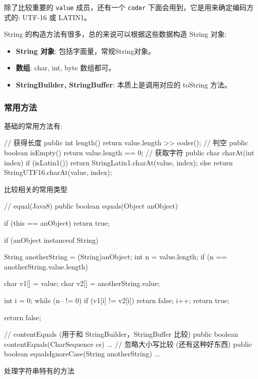 除了比较重要的 \texttt{value} 成员，还有一个 \texttt{coder} 下面会用到，它是用来确定编码方式的: UTF-16 或 LATIN1。

String 的构造方法有很多，总的来说可以根据这些数据构造 String 对象:
\begin{itemize}
    \item \textbf{String 对象}: 包括字面量，常规String对象。
    \item \textbf{数组}: char, int, byte 数组都可。
    \item \textbf{StringBuilder, StringBuffer}: 本质上是调用对应的 toString 方法。
\end{itemize}

\subsubsection{常用方法}

基础的常用方法有:
\begin{Java}
// 获得长度
public int length() {
    return value.length >> coder();
}
// 判空
public boolean isEmpty() {
    return value.length == 0;
}
// 获取字符
public char charAt(int index) {
    if (isLatin1())
        return StringLatin1.charAt(value, index);
    else
        return StringUTF16.charAt(value, index);
}
\end{Java}

比较相关的常用类型
\begin{Java}
// equal(Java8)
public boolean equals(Object anObject) {
    if (this == anObject)
        return true;
    
    if (anObject instanceof String) {
        String anotherString = (String)anObject;
        int n = value.length;
        if (n == anotherString.value.length) {
            char v1[] = value;
            char v2[] = anotherString.value;

            int i = 0;
            while (n-- != 0) {
                if (v1[i] != v2[i])
                    return false;
                i++;
            }
            return true;
        }
    }
    return false;
}
// contentEquals (用于和 StringBuilder，StringBuffer 比较)
public boolean contentEquals(CharSequence cs) { ... }
// 忽略大小写比较 (还有这种好东西)
public boolean equalsIgnoreCase(String anotherString) { ... }
\end{Java}

处理字符串特有的方法

